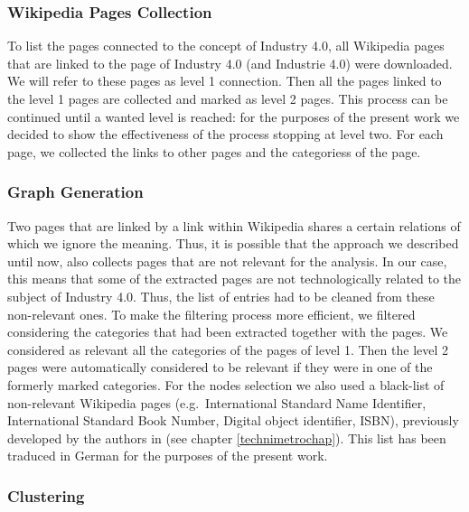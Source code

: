 \documentclass[]{book}
\begin{document}
\subsubsection*{Wikipedia Pages
Collection}\label{wikipedia-pages-collection}

To list the pages connected to the concept of Industry 4.0, all
Wikipedia pages that are linked to the page of Industry 4.0 (and
Industrie 4.0) were downloaded. We will refer to these pages as level 1
connection. Then all the pages linked to the level 1 pages are collected
and marked as level 2 pages. This process can be continued until a
wanted level is reached: for the purposes of the present work we decided
to show the effectiveness of the process stopping at level two. For each
page, we collected the links to other pages and the categoriess of the
page.

\subsubsection*{Graph Generation}\label{graph-generation}

Two pages that are linked by a link within Wikipedia shares a certain
relations of which we ignore the meaning. Thus, it is possible that the
approach we described until now, also collects pages that are not
relevant for the analysis. In our case, this means that some of the
extracted pages are not technologically related to the subject of
Industry 4.0. Thus, the list of entries had to be cleaned from these
non-relevant ones. To make the filtering process more efficient, we
filtered considering the categories that had been extracted together
with the pages. We considered as relevant all the categories of the
pages of level 1. Then the level 2 pages were automatically considered
to be relevant if they were in one of the formerly marked categories.
For the nodes selection we also used a black-list of non-relevant
Wikipedia pages (e.g.~International Standard Name Identifier,
International Standard Book Number, Digital object identifier, ISBN),
previously developed by the authors in (see chapter
\ref{technimetrochap}). This list has been traduced in German for the
purposes of the present work.

\subsubsection*{Clustering}\label{clustering}
\end{document}

